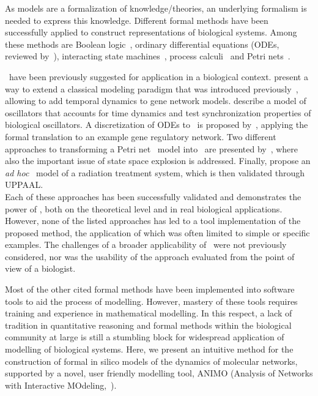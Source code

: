 As models are a formalization of knowledge/theories, an underlying formalism is needed to express
this knowledge. Different formal methods have been successfully applied to construct representations
of biological systems. Among these methods are Boolean logic~\citep{boolean-networks-flower,boolean-networks2},
ordinary differential equations (ODEs, reviewed by~\citealp[]{hidde-review}),
interacting state machines~\citep{interacting-sm1,interacting-sm2},
process calculi~\citep{blenx,bio-pepa} and Petri nets~\citep{petri-nets,petri-nets2}.

\tas\ have been previously suggested for application in a biological context.
\cite{ta-siebert} present a way to extend a classical modeling paradigm
that was introduced previously~\citep{thomas-formalism}, allowing to add temporal dynamics to gene network models.
\cite{bartocci-oscillators} describe a model of oscillators that accounts for time
dynamics and test synchronization properties of biological oscillators.
A discretization of ODEs to \tas\ is proposed by~\citet{oded-ode-ta-discretization}, applying
the formal translation to an example gene regulatory network. Two different approaches to transforming
a Petri net~\citep{petri-nets} model into \tas\ are presented by~\citet{ta-giapponesi},
where also the important issue of state space explosion is addressed.
Finally, \cite{ta-radiazioni} propose an \emph{ad hoc} \tas\ model of a radiation treatment
system, which is then validated through UPPAAL.\\
Each of these approaches has been successfully validated and demonstrates the power of \tas,
both on the theoretical level and in real biological applications. However, none of the listed approaches
has led to a tool implementation of the proposed method, the application of which was often limited to simple
or specific examples. The challenges of a broader applicability of \tas\ were not previously considered,
nor was the usability of the approach evaluated from the point of view of a biologist.

Most of the other cited formal methods have been implemented into software tools to aid the process of modelling.
However, mastery of these tools requires
training and experience in mathematical modelling. In this respect, a lack of tradition in quantitative
reasoning and formal methods within the biological community at large is still a stumbling block for
widespread application of modelling of biological systems. Here, we present an intuitive method for the
construction of formal in silico models of the dynamics of molecular networks, supported by a novel,
user friendly modelling tool, ANIMO (Analysis of Networks with Interactive MOdeling,~\citealp[]{animo-bibe}).

